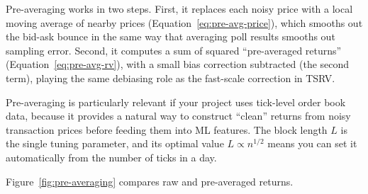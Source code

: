\begin{intuition}
Pre-averaging works in two steps.
First, it replaces each noisy price with a local moving average of nearby prices (Equation~\ref{eq:pre-avg-price}), which smooths out the bid-ask bounce in the same way that averaging poll results smooths out sampling error.
Second, it computes a sum of squared ``pre-averaged returns'' (Equation~\ref{eq:pre-avg-rv}), with a small bias correction subtracted (the second term), playing the same debiasing role as the fast-scale correction in TSRV.
\end{intuition}

\begin{projectconnection}
Pre-averaging is particularly relevant if your project uses tick-level order book data, because it provides a natural way to construct ``clean'' returns from noisy transaction prices before feeding them into ML features.
The block length $L$ is the single tuning parameter, and its optimal value $L \propto n^{1/2}$ means you can set it automatically from the number of ticks in a day.
\end{projectconnection}

Figure~\ref{fig:pre-averaging} compares raw and pre-averaged returns.

